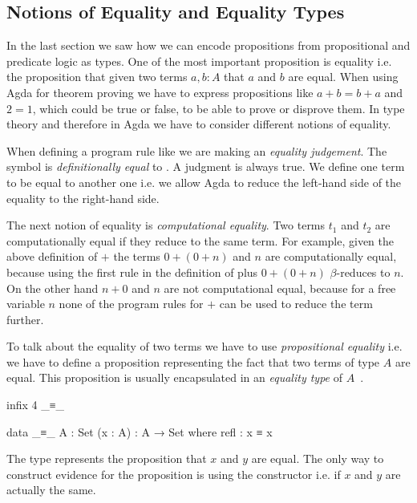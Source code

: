 \subsection{Notions of Equality and Equality Types}

In the last section we saw how we can encode propositions from propositional and
predicate logic as types.
One of the most important proposition is equality i.e. the proposition that
given two terms $a, b : A$ that $a$ and $b$ are equal.
When using Agda for theorem proving we have to express propositions like $a + b
= b + a$ and $2 = 1$, which could be true or false, to be able to prove or
disprove them.
In type theory and therefore in Agda we have to consider different notions of
equality.

When defining a program rule like
\AgdaSpace{}\AgdaSymbol{=}\AgdaSpace{}
we are making an \textit{equality judgement}.
The symbol  is \textit{definitionally equal} to
.
A judgment is always true.
We define one term to be equal to another one i.e. we allow Agda to reduce the
left-hand side of the equality to the right-hand side.

The next notion of equality is \textit{computational equality}.
Two terms $t_1$ and $t_2$ are computationally equal if they reduce to the same
term.
For example, given the above definition of $+$ the terms $0+(0+n)$ and $n$ are
computationally equal, because using the first rule in the definition of plus
$0+(0+n)$ $\beta$-reduces to $n$.
On the other hand $n+0$ and $n$ are not computational equal, because for a free
variable $n$ none of the program rules for $+$ can be used to reduce the term
further.

To talk about the equality of two terms we have to use \textit{propositional
equality} i.e. we have to define a proposition representing the fact that two
terms of type $A$ are equal.
This proposition is usually encapsulated in an \textit{equality type} of
$A$~\cite{hottbook,DBLP:conf/afp/Norell08,DBLP:journals/scp/KokkeSW20}.

\begin{code}[hide]
infix 4 _≡_
\end{code}
\begin{code}
data _≡_ {A : Set} (x : A) : A → Set where
  refl : x ≡ x
\end{code}
The type
\AgdaSpace{}\AgdaSpace{}
represents the proposition that $x$ and $y$ are equal.
The only way to construct evidence for the proposition is using the
 constructor i.e. if $x$ and $y$ are actually the
same.

